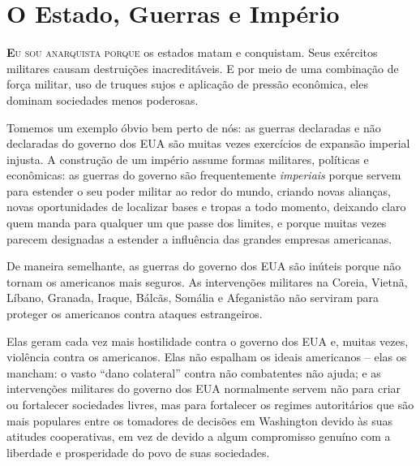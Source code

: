 
\chapter{O Estado, Guerras e Império}
\label{chap:4}

\lettrine[lines=2]{\textcolor{LettrineColor}{\textbf{E}}}{u sou anarquista porque} os estados matam e conquistam. Seus exércitos militares causam destruições inacreditáveis. E por meio de uma combinação de força militar, uso de truques sujos e aplicação de pressão econômica, eles dominam sociedades menos poderosas.

Tomemos um exemplo óbvio bem perto de nós: as guerras declaradas e não declaradas do governo dos EUA são muitas vezes exercícios de expansão imperial injusta. A construção de um império assume formas militares, políticas e econômicas: as guerras do governo são frequentemente \emph{imperiais} porque servem para estender o seu poder militar ao redor do mundo, criando novas alianças, novas oportunidades de localizar bases e tropas a todo momento, deixando claro quem manda para qualquer um que passe dos limites, e porque muitas vezes parecem designadas a estender a influência das grandes empresas americanas.

De maneira semelhante, as guerras do governo dos EUA são inúteis porque não tornam os americanos mais seguros. As intervenções militares na Coreia, Vietnã, Líbano, Granada, Iraque, Bálcãs, Somália e Afeganistão não serviram para proteger os americanos contra ataques estrangeiros.

Elas geram cada vez mais hostilidade contra o governo dos EUA e, muitas vezes, violência contra os americanos. Elas não espalham os ideais americanos -- elas os mancham: o vasto ``dano colateral'' contra não combatentes não ajuda; e as intervenções militares do governo dos EUA normalmente servem não para criar ou fortalecer sociedades livres, mas para fortalecer os regimes autoritários que são mais populares entre os tomadores de decisões em Washington devido às suas atitudes cooperativas, em vez de devido a algum compromisso genuíno com a liberdade e prosperidade do povo de suas sociedades.

